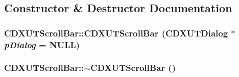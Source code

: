 \subsection{Constructor \& Destructor Documentation}
\hypertarget{class_c_d_x_u_t_scroll_bar_accc3179c9b36ece4b5560bb1310689e7}{
\subsubsection[{CDXUTScrollBar}]{\setlength{\rightskip}{0pt plus 5cm}CDXUTScrollBar::CDXUTScrollBar ({\bf CDXUTDialog} $\ast$ {\em pDialog} = {\ttfamily NULL})}}
\label{class_c_d_x_u_t_scroll_bar_accc3179c9b36ece4b5560bb1310689e7}
\hypertarget{class_c_d_x_u_t_scroll_bar_a8ebd4d8debf6a5f0f746dd3621162a75}{
\subsubsection[{$\sim$CDXUTScrollBar}]{\setlength{\rightskip}{0pt plus 5cm}CDXUTScrollBar::$\sim$CDXUTScrollBar ()}}
\label{class_c_d_x_u_t_scroll_bar_a8ebd4d8debf6a5f0f746dd3621162a75}


